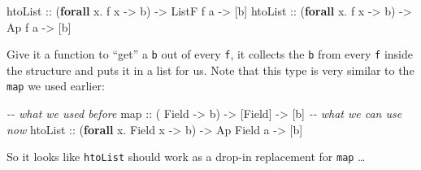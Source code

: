 \documentclass[]{article}
\newenvironment{Shaded}{}{}
\newcommand{\CommentTok}[1]{\textcolor[rgb]{0.38,0.63,0.69}{\textit{#1}}}
\newcommand{\DataTypeTok}[1]{\textcolor[rgb]{0.56,0.13,0.00}{#1}}
\newcommand{\FunctionTok}[1]{\textcolor[rgb]{0.02,0.16,0.49}{#1}}
\newcommand{\KeywordTok}[1]{\textcolor[rgb]{0.00,0.44,0.13}{\textbf{#1}}}
\newcommand{\NormalTok}[1]{#1}
\newcommand{\OperatorTok}[1]{\textcolor[rgb]{0.40,0.40,0.40}{#1}}
\newcommand{\OtherTok}[1]{\textcolor[rgb]{0.00,0.44,0.13}{#1}}
\begin{document}
\begin{Shaded}
\begin{Highlighting}[]
\OtherTok{htoList ::}\NormalTok{ (}\KeywordTok{forall}\NormalTok{ x}\OperatorTok{.}\NormalTok{ f x }\OtherTok{{-}\textgreater{}}\NormalTok{ b) }\OtherTok{{-}\textgreater{}} \DataTypeTok{ListF}\NormalTok{ f a }\OtherTok{{-}\textgreater{}}\NormalTok{ [b]}
\OtherTok{htoList ::}\NormalTok{ (}\KeywordTok{forall}\NormalTok{ x}\OperatorTok{.}\NormalTok{ f x }\OtherTok{{-}\textgreater{}}\NormalTok{ b) }\OtherTok{{-}\textgreater{}} \DataTypeTok{Ap}\NormalTok{    f a }\OtherTok{{-}\textgreater{}}\NormalTok{ [b]}
\end{Highlighting}
\end{Shaded}

Give it a function to ``get'' a \texttt{b} out of every \texttt{f}, it collects
the \texttt{b} from every \texttt{f} inside the structure and puts it in a list
for us. Note that this type is very similar to the \texttt{map} we used earlier:

\begin{Shaded}
\begin{Highlighting}[]
\CommentTok{{-}{-} what we used before}
\FunctionTok{map}\OtherTok{     ::}\NormalTok{ (          }\DataTypeTok{Field}   \OtherTok{{-}\textgreater{}}\NormalTok{ b) }\OtherTok{{-}\textgreater{}}\NormalTok{ [}\DataTypeTok{Field}\NormalTok{]    }\OtherTok{{-}\textgreater{}}\NormalTok{ [b]}
\CommentTok{{-}{-} what we can use now}
\OtherTok{htoList ::}\NormalTok{ (}\KeywordTok{forall}\NormalTok{ x}\OperatorTok{.} \DataTypeTok{Field}\NormalTok{ x }\OtherTok{{-}\textgreater{}}\NormalTok{ b) }\OtherTok{{-}\textgreater{}} \DataTypeTok{Ap} \DataTypeTok{Field}\NormalTok{ a }\OtherTok{{-}\textgreater{}}\NormalTok{ [b]}
\end{Highlighting}
\end{Shaded}

So it looks like \texttt{htoList} should work as a drop-in replacement for
\texttt{map} \ldots{}
\end{document}
